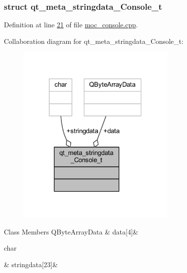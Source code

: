 \subsubsection{struct qt\+\_\+meta\+\_\+stringdata\+\_\+\+Console\+\_\+t}


Definition at line \hyperlink{a00013_source_l00021}{21} of file \hyperlink{a00013_source}{moc\+\_\+console.\+cpp}.



Collaboration diagram for qt\+\_\+meta\+\_\+stringdata\+\_\+\+Console\+\_\+t\+:
\nopagebreak
\begin{figure}[H]
\begin{center}
\leavevmode
\includegraphics[width=222pt]{de/d38/a00160}
\end{center}
\end{figure}
\begin{DoxyFields}{Class Members}
\hypertarget{a00013_af7131d57b034ad13a178d273cfee74c2}{Q\+Byte\+Array\+Data}\label{a00013_af7131d57b034ad13a178d273cfee74c2}
&
data\mbox{[}4\mbox{]}&
\\
\hline

\hypertarget{a00013_a63ab346e732e08dad62cdef78b05d53d}{char}\label{a00013_a63ab346e732e08dad62cdef78b05d53d}
&
stringdata\mbox{[}23\mbox{]}&
\\
\hline

\end{DoxyFields}


